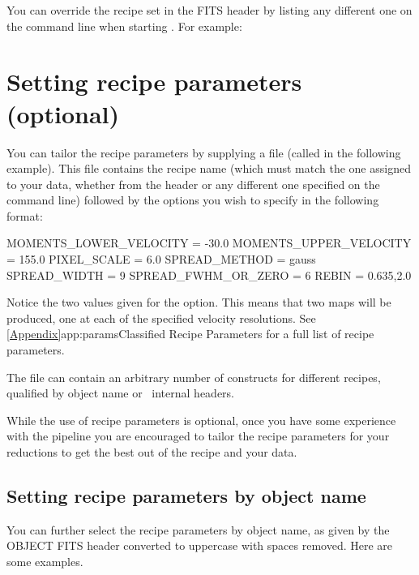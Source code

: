 \documentclass[11pt,oneside,chapters]{starlink}
\begin{document}
You can override the recipe set in the FITS header by listing any different
one on the command line when starting \ORACDR. For example:
\begin{terminalv}
\end{terminalv}

\section{Setting recipe parameters (optional)}
\label{sec:recpars}

You can tailor the recipe parameters by supplying a  file
(called  in the following example). This file contains the
recipe name (which must match the one assigned to your data, whether
from the header or any different one specified on the command line)
followed by the options you wish to specify in the following format:

\vspace{0.2cm}
\begin{terminalv}
MOMENTS_LOWER_VELOCITY = -30.0
MOMENTS_UPPER_VELOCITY = 155.0
PIXEL_SCALE = 6.0
SPREAD_METHOD = gauss
SPREAD_WIDTH = 9
SPREAD_FWHM_OR_ZERO = 6
REBIN = 0.635,2.0
\end{terminalv}

Notice the two values given for the  option. This means
that two maps will be produced, one at each of the specified velocity
resolutions. See \cref{Appendix}{app:params}{Classified Recipe
Parameters} for a full list of recipe
parameters.

The  file can contain an arbitrary number of \param{[]}
constructs for different recipes, qualified by object name or
\ORACDR\ internal headers.

While the use of recipe parameters is optional, once you have some
experience with the pipeline you are encouraged to tailor the recipe
parameters for your reductions to get the best out of the recipe and
your data.

\subsection{Setting recipe parameters by object name}
\label{sec:recpars_object}

You can further select the recipe parameters by object name, as given
by the OBJECT FITS header converted to uppercase with spaces removed.
Here are some examples.
\end{document}
